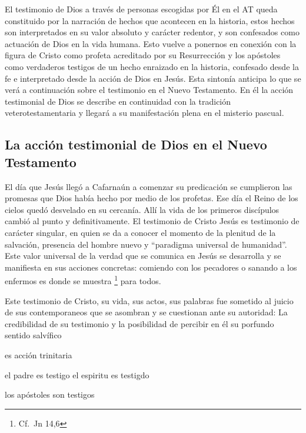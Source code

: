 El testimonio de Dios a través de personas escogidas por Él en el AT queda
constituido por la narración de hechos que acontecen en la historia, estos
hechos son interpretados en su valor absoluto y carácter redentor, y son
confesados como actuación de Dios en la vida
humana.\autocite[Cf.][119]{prades2015testimonio} Esto vuelve a ponernos en
conexión con la figura de Cristo como profeta acreditado por su Resurrección y
los apóstoles como verdaderos testigos de un hecho enraizado en la historia,
confesado desde la fe e interpretado desde la acción de Dios en Jesús. Esta
sintonía anticipa lo que se verá a continuación sobre el testimonio en el Nuevo
Testamento. En él la acción testimonial de Dios se describe en continuidad con
la tradición veterotestamentaria y llegará a su manifestación plena en el
misterio pascual.

\subsection{La acción testimonial de Dios en el Nuevo Testamento}
El día que Jesús llegó a Cafarnaún a comenzar su predicación se cumplieron las
promesas que Dios había hecho por medio de los profetas. Ese día el Reino de los
  cielos quedó desvelado en su cercanía. Allí la vida de los primeros discípulos
cambió al punto y definitivamente. El testimonio de Cristo \autocite[126]{prades2015testimonio} Jesús es testimonio de
carácter singular,\autocite[Cf.][279]{ninot2009tf} en quien se da a conocer el
momento de la plenitud de la salvación,\autocite[Cf.][290]{ninot2009tf}
presencia del hombre nuevo y ``paradigma universal de
humanidad''\autocite[Cf.][291]{ninot2009tf}. Este valor universal de la verdad
que se comunica en Jesús se desarrolla y se manifiesta en sus acciones
concretas: comiendo con los pecadores o sanando a los enfermos es donde se
muestra \footnote{Cf.~Jn 14,6}
para todos.

Este testimonio de Cristo, su vida, sus actos, sus palabras fue sometido al
juicio de sus contemporaneos que se asombran y se cuestionan ante su autoridad:
\autocite[124]{prades2015testimonio}
La credibilidad de su testimonio y la posibilidad de percibir en él su porfundo
sentido salvífico

es acción trinitaria

el padre es testigo
el espiritu es testigdo

los apóstoles son testigos
